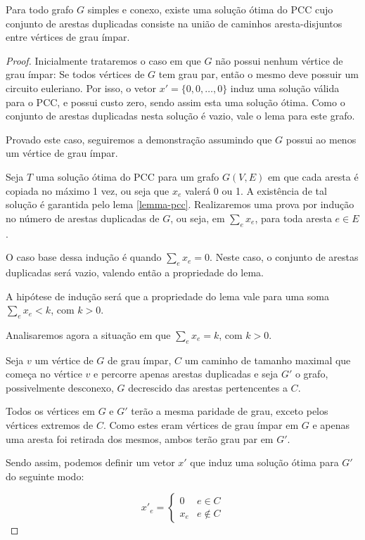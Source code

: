 \begin{lemma}
    Para todo grafo $G$ simples e conexo, existe uma solução ótima do PCC cujo conjunto de arestas duplicadas consiste na união de caminhos aresta-disjuntos entre vértices de grau ímpar.
\end{lemma}

\begin{proof}

    Inicialmente trataremos o caso em que $G$ não possui nenhum vértice de grau ímpar:
    Se todos vértices de $G$ tem grau par, então o mesmo deve possuir um circuito euleriano. 
    Por isso, o vetor $x' = \{0, 0, \dots, 0\}$ induz uma solução válida para o PCC, e possui custo zero, sendo assim esta uma solução ótima.
    Como o conjunto de arestas duplicadas nesta solução é vazio, vale o lema para este grafo.

    Provado este caso, seguiremos a demonstração assumindo que $G$ possui ao menos um vértice de grau ímpar.

    Seja $T$ uma solução ótima do PCC para um grafo $G(V, E)$  em que cada aresta é copiada no máximo 1 vez, ou seja que $x_e$ valerá 0 ou 1. 
    A existência de tal solução é garantida pelo lema \ref{lemma-pcc}.
    Realizaremos uma prova por indução no número de arestas duplicadas de $G$, ou seja, em $\sum_e x_e$, para toda aresta $e \in E$. 

    O caso base dessa indução é quando $\sum_e x_e = 0$. 
    Neste caso, o conjunto de arestas duplicadas será vazio, valendo então a propriedade do lema.

    A hipótese de indução será que a propriedade do lema vale para uma soma $\sum_e x_e < k$, com $k > 0$.

    Analisaremos agora a situação em que $\sum_e x_e = k$, com $k > 0$.

    Seja $v$ um vértice de $G$ de grau ímpar,  $C$ um caminho de tamanho maximal que começa no vértice $v$ e percorre apenas arestas duplicadas e seja $G'$ o grafo, possivelmente desconexo, $G$ decrescido das arestas pertencentes a $C$.


    Todos os vértices em $G$ e $G'$ terão a mesma paridade de grau, exceto pelos vértices extremos de $C$. 
    Como estes eram vértices de grau ímpar em $G$ e apenas uma aresta foi retirada dos mesmos, ambos terão grau par em $G'$.

    Sendo assim, podemos definir um vetor $x'$ que induz uma solução ótima para $G'$ do seguinte modo:

    \[ 
        x'_e = 
        \begin{cases} 
            0 & e \in C \\
            x_e & e \notin C 
        \end{cases}
    \]



\end{proof}
